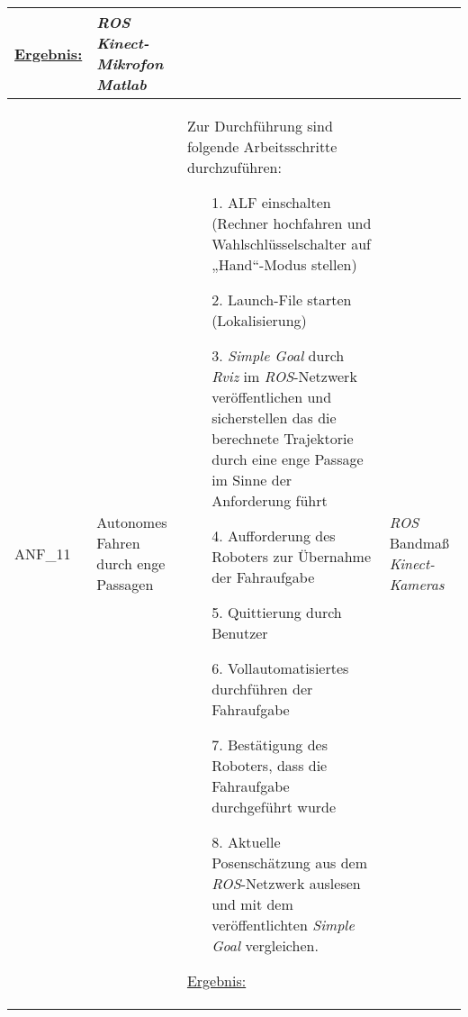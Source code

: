 \documentclass[12pt,a4paper,oneside,numbers=noenddot,captions=tableheading,toc=bibliography,openany,tikz,margin=5mm]{scrbook}
\begin{document}
\begin{longtable}{|p{}|p{}|p{7cm}|p{}|}
	\underline{Ergebnis:}\newline
	\newline
	
	\textbf{}%
	& \textit{ROS}\newline
	\textit{Kinect-Mikrofon}
	\textit{Matlab}
	\\
	\hline
	
	ANF\_11& Autonomes Fahren durch enge Passagen & Zur Durchführung sind folgende Arbeitsschritte durchzuführen:
	\begin{itemize}
		\item[1.]	ALF einschalten (Rechner hochfahren und Wahlschlüsselschalter auf „Hand“-Modus stellen)
		\item[2.]	Launch-File starten (Lokalisierung)
		\item[3.]	\textit{Simple Goal} durch \textit{Rviz} im \textit{ROS}-Netzwerk veröffentlichen und sicherstellen das die berechnete Trajektorie durch eine enge Passage im Sinne der Anforderung führt
		\item[4.]	Aufforderung des Roboters zur Übernahme der Fahraufgabe
		\item[5.]	Quittierung durch Benutzer
		\item[6.]	Vollautomatisiertes durchführen der Fahraufgabe
		\item[7.]	Bestätigung des Roboters, dass die Fahraufgabe durchgeführt wurde
		\item[8.]	Aktuelle Posenschätzung aus dem \textit{ROS}-Netzwerk auslesen und mit dem veröffentlichten \textit{Simple Goal} vergleichen.
	\end{itemize}
	
	\underline{Ergebnis:}\newline
	\newline
	\textbf{}%
	& \textit{ROS}\newline
	Bandmaß\newline
	\textit{Kinect-Kameras}
	\\
	\hline
\end{longtable} 
\end{document}
